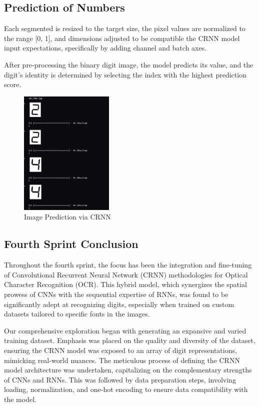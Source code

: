 \subsection{Prediction of Numbers}

Each segmented is resized to the target size, the pixel values are normalized to the range [0, 1], and dimensions adjusted to be compatible the CRNN model input expectations, specifically by adding channel and batch axes.

After pre-processing the binary digit image, the model predicts its value, and the digit's identity is determined by selecting the index with the highest prediction score.

\begin{figure}[ht]
    \centering
    \includegraphics[width=0.4\textwidth]{Figures/Results/crnn/sample_predict.jpg}
    \caption[Image Prediction via CRNN]{Image Prediction via CRNN}
    \label{fig:Image Prediction via CRNN}
\end{figure}

\newpage

\subsection{Fourth Sprint Conclusion}

Throughout the fourth sprint, the focus has been the integration and fine-tuning of Convolutional Recurrent Neural Network (CRNN) methodologies for Optical Character Recognition (OCR). This hybrid model, which synergizes the spatial prowess of CNNs with the sequential expertise of RNNs, was found to be significantly adept at recognizing digits, especially when trained on custom datasets tailored to specific fonts in the images.

Our comprehensive exploration began with generating an expansive and varied training dataset. Emphasis was placed on the quality and diversity of the dataset, ensuring the CRNN model was exposed to an array of digit representations, mimicking real-world nuances. The meticulous process of defining the CRNN model architecture was undertaken, capitalizing on the complementary strengths of CNNs and RNNs. This was followed by data preparation steps, involving loading, normalization, and one-hot encoding to ensure data compatibility with the model.

